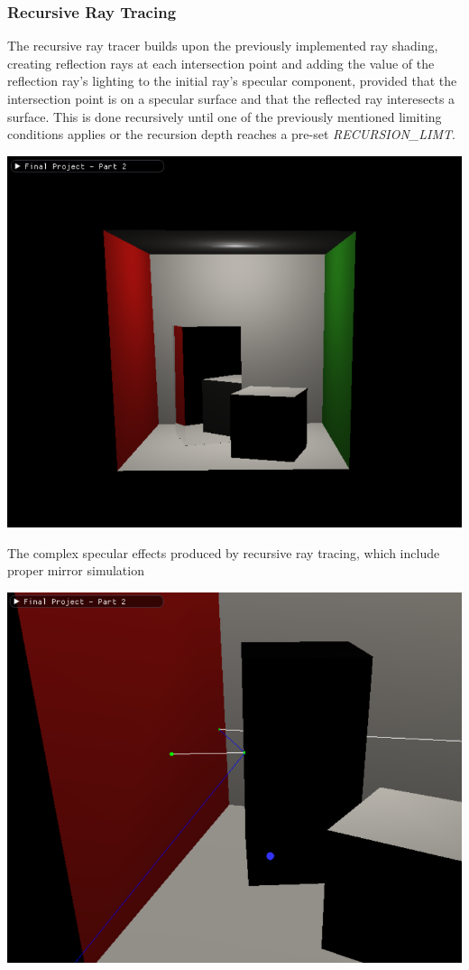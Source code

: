 \documentclass{article}
\begin{document}
    \subsubsection{Recursive Ray Tracing}
    The recursive ray tracer builds upon the previously implemented ray shading,
    creating reflection rays at each intersection point and adding the value of the reflection ray's lighting to the initial ray's specular component,
    provided that the intersection point is on a specular surface and that the reflected ray interesects a surface.
    This is done recursively until one of the previously mentioned limiting conditions applies or the recursion depth reaches a pre-set \emph{RECURSION\_LIMT}.

    \begin{center}
        \includegraphics[scale=0.65]{images/recursive_ray_tracer_showcase.png}

        The complex specular effects produced by recursive ray tracing, which include proper mirror simulation

        \vspace{5mm}

        \includegraphics[scale=0.65]{images/recursive_ray_tracer_debug.png}


\end{center}
\end{document}
